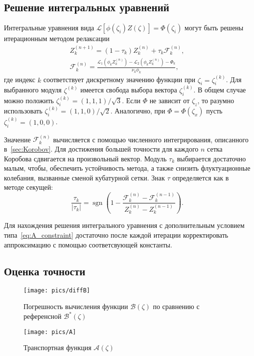 \documentclass[a4paper,12pt]{article}
\DeclareMathOperator{\sgn}{sgn}
\begin{document}
\subsection{Решение интегральных уравнений}\label{sec:int_equations}

Интегральные уравнения вида \(\mathcal{L}[\phi(\zeta_i)Z(\zeta)] = \Phi(\zeta_i)\)
могут быть решены итерационным методом релаксации
\begin{gather}\label{eq:relax_method}
    Z_k^{(n+1)} = (1-\tau_k)Z_k^{(n)} + \tau_k\mathcal{F}_k^{(n)}, \\
    \mathcal{F}_k^{(n)} = \frac{\mathcal{L}_1(\phi_k Z_k^{(n)}) - \mathcal{L}_2(\phi_k Z_k^{(n)}) - \Phi_k}{\nu_k\phi_k},
\end{gather}
где индекс \(k\) соответствует дискретному значению функции при \(\zeta_i=\zeta_i^{(k)}\).
Для выбранного модуля \(\zeta^{(k)}\) имеется свобода выбора вектора \(\zeta_i^{(k)}\).
В общем случае можно положить \(\zeta_i^{(k)} = (1,1,1)/\sqrt3\).
Если \(\Phi\) не зависит от \(\zeta_z\), то разумно использовать \(\zeta_i^{(k)} = (1,1,0)/\sqrt2\).
Аналогично, при \(\Phi=\Phi(\zeta_x)\) пусть \(\zeta_i^{(k)} = (1,0,0)\).

Значение \(\mathcal{F}_k^{(n)}\) вычисляется с помощью численного интегрирования, описанного в~\ref{sec:Korobov}.
Для достижения большей точности для каждого \(n\) сетка Коробова сдвигается на произвольный вектор.
Модуль \(\tau_k\) выбирается достаточно малым, чтобы, обеспечить устойчивость метода,
а также снизить флуктуационные колебания, вызванные сменой кубатурной сетки.
Знак \(\tau\) определяется как в методе секущей:
\begin{equation}\label{eq:secant_method}
    \frac{\tau_k}{|\tau_k|} = \sgn\left(1-\frac{\mathcal{F}_k^{(n)} - \mathcal{F}_k^{(n-1)}}{Z_k^{(n)}-Z_k^{(n-1)}}\right).
\end{equation}

Для нахождения решения интегрального уравнения с дополнительным условием типа~\eqref{eq:A_constraint}
достаточно после каждой итерации корректировать аппроксимацию с помощью соответсвующей константы.

\subsection{Оценка точности}

\begin{figure}
    \centering
    \begin{minipage}[b]{0.5\textwidth}
        \centering
        \texttt{[image: pics/diffB]}
        \caption{Погрешность вычисления функции \(\mathcal{B}(\zeta)\)
            по сравнению с референсной \(\mathcal{B}^*(\zeta)\)}
        \label{fig:diffB}
    \end{minipage}%
    \begin{minipage}[b]{0.5\textwidth}
        \centering
        \texttt{[image: pics/A]}
        \caption{Транспортная функция \(\mathcal{A}(\zeta)\)}
        \label{fig:A}
    \end{minipage}
\end{figure}
\end{document}
